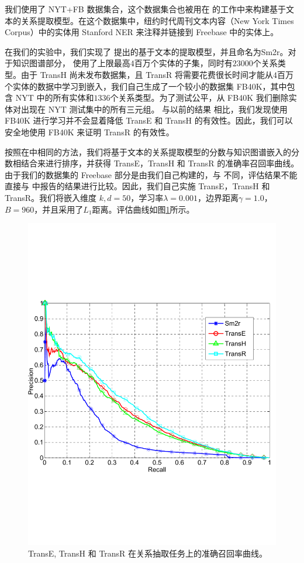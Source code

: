     我们使用了 NYT+FB 数据集合，这个数据集合也被用在  的工作中来构建基于文本的关系提取模型。在这个数据集中，纽约时代周刊文本内容（New York Times Corpus）中的实体用 Stanford NER 来注释并链接到 Freebase 中的实体上。

    在我们的实验中，我们实现了  提出的基于文本的提取模型，并且命名为Sm2r。对于知识图谱部分， 使用了上限最高$4$百万个实体的子集，同时有$23000$个关系类型。由于 TransH 尚未发布数据集，且 TransR 将需要花费很长时间才能从$4$百万个实体的数据中学习到嵌入，我们自己生成了一个较小的数据集 FB40K，其中包含 NYT 中的所有实体和$1336$个关系类型。为了测试公平，从 FB40K 我们删除实体对出现在 NYT 测试集中的所有三元组。 与以前的结果  相比，我们发现使用 FB40K 进行学习并不会显着降低 TransE 和 TransH 的有效性。因此，我们可以安全地使用 FB40K 来证明 TransR 的有效性。

    按照在中相同的方法，我们将基于文本的关系提取模型的分数与知识图谱嵌入的分数相结合来进行排序，并获得 TransE，TransH 和 TransR 的准确率召回率曲线。由于我们的数据集的 Freebase 部分是由我们自己构建的，与  不同，评估结果不能直接与  中报告的结果进行比较。因此，我们自己实施 TransE，TransH 和 TransR。我们将嵌入维度 $k, d = 50$，学习率$\lambda = 0.001$，边界距离$\gamma = 1.0$，$B = 960$，并且采用了$L_1$距离。评估曲线如图\ref{fig_1:relation_extraction}所示。

    \begin{figure}[htb]
    \centering
    \includegraphics[width=0.8\columnwidth]{figures/trans/RE_text}
    \caption{TransE, TransH 和 TransR 在关系抽取任务上的准确召回率曲线。}
    \label{fig_1:relation_extraction}
    \end{figure}

